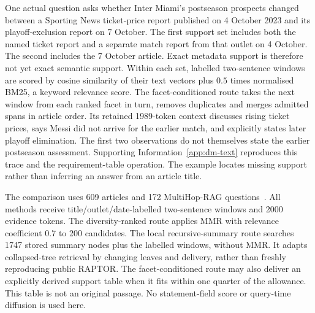 \documentclass[reprint,aps,prx,superscriptaddress,nofootinbib,longbibliography]{revtex4-2}
\begin{document}
One actual question asks whether Inter Miami's postseason prospects changed between a Sporting News ticket-price report published on 4 October 2023 and its playoff-exclusion report on 7 October.
The first support set includes both the named ticket report and a separate match report from that outlet on 4 October.
The second includes the 7 October article.
Exact metadata support is therefore not yet exact semantic support.
Within each set, labelled two-sentence windows are scored by cosine similarity of their text vectors plus \(0.5\) times normalised BM25, a keyword relevance score.
The facet-conditioned route takes the next window from each ranked facet in turn, removes duplicates and merges admitted spans in article order.
Its retained 1989-token context discusses rising ticket prices, says Messi did not arrive for the earlier match, and explicitly states later playoff elimination.
The first two observations do not themselves state the earlier postseason assessment.
Supporting Information~\ref{app:dm-text} reproduces this trace and the requirement-table operation.
The example locates missing support rather than inferring an answer from an article title.

The comparison uses 609 articles and 172 MultiHop-RAG questions~\cite{multihoprag}.
All methods receive title/outlet/date-labelled two-sentence windows and 2000 evidence tokens.
The diversity-ranked route applies MMR with relevance coefficient \(0.7\) to 200 candidates.
The local recursive-summary route searches 1747 stored summary nodes plus the labelled windows, without MMR.
It adapts collapsed-tree retrieval by changing leaves and delivery, rather than freshly reproducing public RAPTOR.
The facet-conditioned route may also deliver an explicitly derived support table when it fits within one quarter of the allowance.
This table is not an original passage.
No statement-field score or query-time diffusion is used here.
\end{document}
